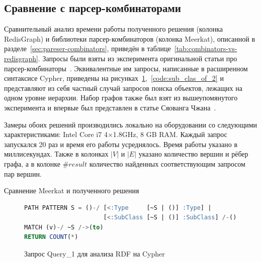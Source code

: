 \subsection{Сравнение с парсер-комбинаторами}\label{sec:parse-comp-compare}
Сравнительный анализ времени работы полученного решения (колонка RedisGraph) и библиотеки парсер-комбинаторов (колонка Meer\-kat), описанной в разделе~\ref{sec:pareser-combinators}, приведён в таблице~\ref{tab:combinators-vs-redisgraph}. Запросы были взяты из эксперимента оригинальной статьи про парсер-комбинаторы~\cite{parser-combinators}. Эквивалентные им запросы, написанные в расширенном синтаксисе Cyp\-her, приведены на рисунках~\ref{code:sub_clas_of_1},~\ref{code:sub_clas_of_2} и представляют из себя частный случай запросов поиска объектов, лежащих на одном уровне иерархии. Набор графов также был взят из вышеупомянутого эксперимента и впервые был представлен в статье Сяованга Чжана~\cite{zhlang-2016}.


Замеры обоих решений производились локально на оборудовании со следующими характеристиками: Intel Core i7 4$\times$1.8GHz, 8 GB RAM. Каждый запрос запускался 20 раз и время его работы усреднялось. Время работы указано в миллисекундах. Также в колонках $|V|$ и $|E|$ указано количество вершин и рёбер графа, а в колонке $\#result$ количество найденных соответствующим запросом пар вершин. 

\begin{table}[h!]
\begin{adjustbox}{max width=\textwidth}

\end{adjustbox}
\caption{Сравнение Meerkat и полученного решения}
\label{tab:combinators-vs-redisgraph}
\end{table}

\begin{figure}[h!]
\begin{adjustbox}{max width=\textwidth}
\begin{lstlisting}[language=sql]
PATH PATTERN S = ()-/ [<:Type     [~S | ()] :Type] | 
                      [<:SubClass [~S | ()] :SubClass] /-()
MATCH (v)-/ ~S /->(to)
RETURN COUNT(*)
\end{lstlisting}
\end{adjustbox}
\caption{Запрос Query\_1 для анализа RDF на Cypher}
\label{code:sub_clas_of_1}
\end{figure}

